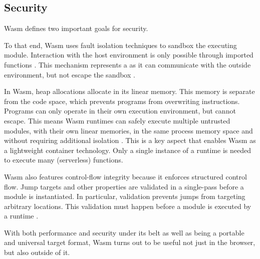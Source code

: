 \subsection{Security}


Wasm defines two important goals for security.

\begin{quote}
\end{quote}

To that end, Wasm uses fault isolation techniques to sandbox the executing module. Interaction with the host environment is only possible through imported functions \cite{W3C2020}. This mechanism represents a  as it can communicate with the outside environment, but not escape the sandbox \cite{Haas2017}.

In Wasm, heap allocations allocate in its linear memory. This memory is separate from the code space, which prevents programs from overwriting instructions. Programs can only operate in their own execution environment, but cannot escape. This means Wasm runtimes can safely execute multiple untrusted modules, with their own linear memories, in the same process memory space and without requiring additional isolation \cite{Haas2017}. This is a key aspect that enables Wasm as a lightweight container technology. Only a single instance of a runtime is needed to execute many (serverless) functions.

Wasm also features control-flow integrity because it enforces structured control flow. Jump targets and other properties are validated in a single-pass before a module is instantiated. In particular, validation prevents jumps from targeting arbitrary locations. This validation must happen before a module is executed by a runtime \cite{Haas2017}.

With both performance and security under its belt as well as being a portable and universal target format, Wasm turns out to be useful not just in the browser, but also outside of it.


